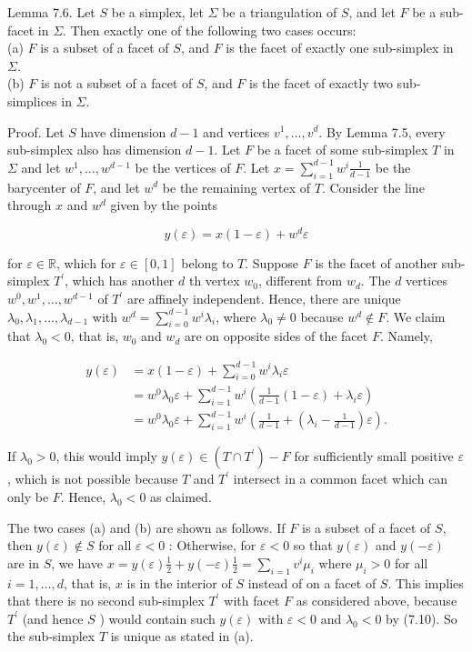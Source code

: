 \documentclass[12pt]{article}
\begin{document}
Lemma 7.6. Let $S$ be a simplex, let $\Sigma$ be a triangulation of $S$, and let $F$ be a sub-facet in $\Sigma$. Then exactly one of the following two cases occurs:\\
(a) $F$ is a subset of a facet of $S$, and $F$ is the facet of exactly one sub-simplex in $\Sigma$.\\
(b) $F$ is not a subset of a facet of $S$, and $F$ is the facet of exactly two sub-simplices in $\Sigma$.

Proof. Let $S$ have dimension $d-1$ and vertices $v^{1}, \ldots, v^{d}$. By Lemma 7.5, every sub-simplex also has dimension $d-1$. Let $F$ be a facet of some sub-simplex $T$ in $\Sigma$ and let $w^{1}, \ldots, w^{d-1}$ be the vertices of $F$. Let $x=\sum_{i=1}^{d-1} w^{i} \frac{1}{d-1}$ be the barycenter of $F$, and let $w^{d}$ be the remaining vertex of $T$. Consider the line through $x$ and $w^{d}$ given by the points

$$
y(\varepsilon)=x(1-\varepsilon)+w^{d} \varepsilon
$$

for $\varepsilon \in \mathbb{R}$, which for $\varepsilon \in[0,1]$ belong to $T$. Suppose $F$ is the facet of another sub-simplex $T^{\prime}$, which has another $d$ th vertex $w_{0}$, different from $w_{d}$. The $d$ vertices $w^{0}, w^{1}, \ldots, w^{d-1}$ of $T^{\prime}$ are affinely independent. Hence, there are unique $\lambda_{0}, \lambda_{1}, \ldots, \lambda_{d-1}$ with $w^{d}=\sum_{i=0}^{d-1} w^{i} \lambda_{i}$, where $\lambda_{0} \neq 0$ because $w^{d} \notin F$. We claim that $\lambda_{0}<0$, that is, $w_{0}$ and $w_{d}$ are on opposite sides of the facet $F$. Namely,


\begin{align*}
y(\varepsilon) & =x(1-\varepsilon)+\sum_{i=0}^{d-1} w^{i} \lambda_{i} \varepsilon \\
& =w^{0} \lambda_{0} \varepsilon+\sum_{i=1}^{d-1} w^{i}\left(\frac{1}{d-1}(1-\varepsilon)+\lambda_{i} \varepsilon\right) \\
& =w^{0} \lambda_{0} \varepsilon+\sum_{i=1}^{d-1} w^{i}\left(\frac{1}{d-1}+\left(\lambda_{i}-\frac{1}{d-1}\right) \varepsilon\right) . \tag{7.10}
\end{align*}


If $\lambda_{0}>0$, this would imply $y(\varepsilon) \in\left(T \cap T^{\prime}\right)-F$ for sufficiently small positive $\varepsilon$, which is not possible because $T$ and $T^{\prime}$ intersect in a common facet which can only be $F$. Hence, $\lambda_{0}<0$ as claimed.

The two cases (a) and (b) are shown as follows. If $F$ is a subset of a facet of $S$, then $y(\varepsilon) \notin S$ for all $\varepsilon<0$ : Otherwise, for $\varepsilon<0$ so that $y(\varepsilon)$ and $y(-\varepsilon)$ are in $S$, we have $x=y(\varepsilon) \frac{1}{2}+y(-\varepsilon) \frac{1}{2}=\sum_{i=1} v^{i} \mu_{i}$ where $\mu_{i}>0$ for all $i=1, \ldots, d$, that is, $x$ is in the interior of $S$ instead of on a facet of $S$. This implies that there is no second sub-simplex $T^{\prime}$ with facet $F$ as considered above, because $T^{\prime}$ (and hence $S$ ) would contain such $y(\varepsilon)$ with $\varepsilon<0$ and $\lambda_{0}<0$ by (7.10). So the sub-simplex $T$ is unique as stated in (a).
\end{document}
